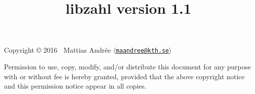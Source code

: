 \documentclass[11pt,b5paper,openright,fleqn]{book}
\begin{document}
\frontmatter

\title{{\Huge \bf libzahl version 1.1}}
\author{}
\date{\vspace{3in}}
\maketitle

\thispagestyle{empty}
\null
\vfill
\noindent
Copyright \copyright{} 2016 $~$  Mattias Andrée $\langle$\href{mailto:maandree@kth.se}{\texttt{maandree@kth.se}}$\rangle$
\vspace{1ex}

\noindent
{\small
Permission to use, copy, modify, and/or distribute this document for any
purpose with or without fee is hereby granted, provided that the above
copyright notice and this permission notice appear in all copies.}
\newpage




\setcounter{tocdepth}{2}
\dominitoc
\tableofcontents


\mainmatter













\appendix


\backmatter

\printindex
\end{document}
